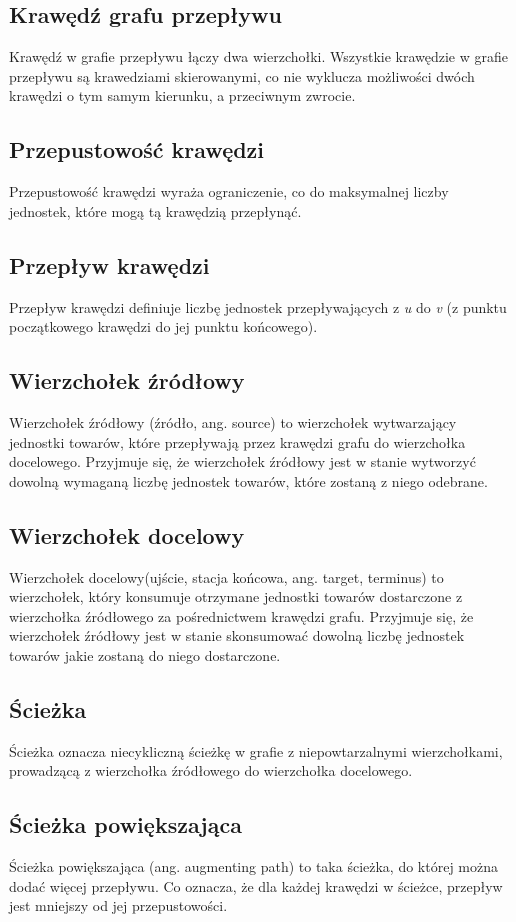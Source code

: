 \documentclass[10pt]{minutes}
\begin{document}
\subsection{Krawędź grafu przepływu}
Krawędź w grafie przepływu łączy dwa wierzchołki. Wszystkie krawędzie w grafie przepływu są krawedziami skierowanymi, co nie wyklucza możliwości dwóch krawędzi o tym samym kierunku, a przeciwnym zwrocie.
\subsection{Przepustowość krawędzi}
Przepustowość krawędzi wyraża ograniczenie, co do maksymalnej liczby jednostek, które mogą tą krawędzią przepłynąć.
\subsection{Przepływ krawędzi}
Przepływ krawędzi definiuje liczbę jednostek przepływających z \emph{u} do \emph{v} (z punktu początkowego krawędzi do jej punktu końcowego).
\subsection{Wierzchołek źródłowy}
Wierzchołek źródłowy (źródło, ang. source) to wierzchołek wytwarzający jednostki towarów, które przepływają przez krawędzi grafu do wierzchołka docelowego. Przyjmuje się, że wierzchołek źródłowy jest w stanie wytworzyć dowolną wymaganą liczbę jednostek towarów, które zostaną z niego odebrane.
\subsection{Wierzchołek docelowy}
Wierzchołek docelowy(ujście, stacja końcowa, ang. target, terminus) to wierzchołek, który konsumuje otrzymane jednostki towarów dostarczone z wierzchołka źródłowego za pośrednictwem krawędzi grafu. Przyjmuje się, że wierzchołek źródłowy jest w stanie skonsumować dowolną liczbę jednostek towarów jakie zostaną do niego dostarczone.
\subsection{Ścieżka}
Ścieżka oznacza niecykliczną ścieżkę w grafie z niepowtarzalnymi wierzchołkami, prowadzącą z wierzchołka źródłowego do wierzchołka docelowego.
\subsection{Ścieżka powiększająca}
Ścieżka powiększająca (ang. augmenting path) to taka ścieżka, do której można dodać więcej przepływu. Co oznacza, że dla każdej krawędzi w ścieżce, przepływ jest mniejszy od jej przepustowości.
\end{document}
